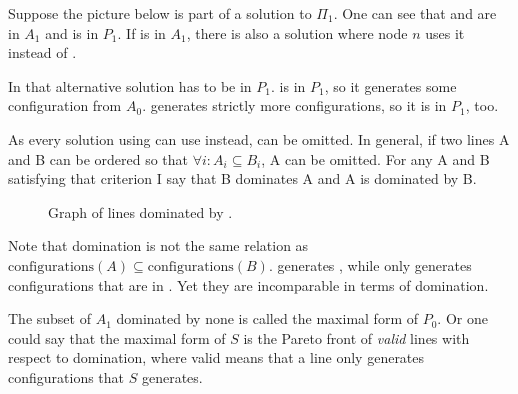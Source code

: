 \documentclass[english, 12pt, a4paper, sci, a-1b, online]{aaltothesis}
\begin{document}
Suppose the picture below is part of a solution to $\Pi_{1}$. One can see that  and  are in $A_{1}$ and  is in $P_{1}$. If  is in $A_{1}$, there is also a solution where node $n$ uses it instead of .


In that alternative solution  has to be in $P_{1}$.  is in $P_{1}$, so it generates some configuration from $A_{0}$.  generates strictly more configurations, so it is in $P_{1}$, too.

As every solution using  can use  instead,  can be omitted. In general, if two lines A and B can be ordered so that $\forall i : A_i \subseteq B_i$, A can be omitted.\cite{DA2020} For any A and B satisfying that criterion I say that B dominates A and A is dominated by B.

\begin{figure}[h]
  \centering
  \caption{Graph of lines dominated by .}
\end{figure}

Note that domination is not the same relation as $\text{configurations}(A) \subseteq \text{configurations}(B)$.  generates , while  only generates configurations that are in . Yet they are incomparable in terms of domination.

The subset of $A_{1}$ dominated by none is called the maximal form of $P_{0}$. Or one could say that the maximal form of $S$ is the Pareto front of \emph{valid} lines with respect to domination, where valid means that a line only generates configurations that $S$ generates.
\end{document}
